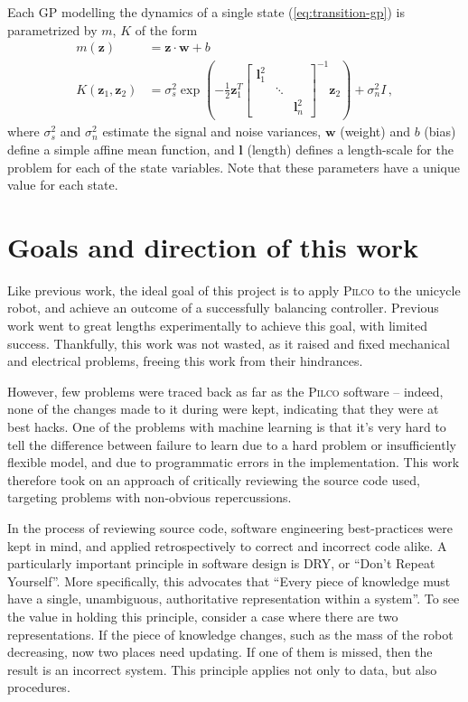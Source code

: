 \documentclass[main.tex]{subfiles}
\begin{document}
		Each GP modelling the dynamics of a single state (\cref{eq:transition-gp}) is parametrized by $m$, $K$ of the form
		\begin{align}
			m(\bm{z}) &= \bm{z} \cdot \bm{w} + b \\
			K(\bm{z}_1, \bm{z}_2) &= \sigma_s^2 \exp \left(
				-\frac{1}{2}
				\bm{z}_1^T
				\begin{bmatrix}
					\bm{l}_1^2 && \\
					& \ddots & \\
					&& \bm{l}_n^2
				\end{bmatrix}^{-1}
				\bm{z}_2
			\right) + \sigma_n^2 I \,,
		\end{align}
		where $\sigma_s^2$ and $\sigma_n^2$ estimate the signal and noise variances, $\bm{w}$ (weight) and $b$ (bias) define a simple affine mean function, and $\bm{l}$ (length) defines a length-scale for the problem for each of the state variables.
		Note that these parameters have a unique value for each state.

\section{Goals and direction of this work}
	\label{sec:dry}

	Like previous work, the ideal goal of this project is to apply \textsc{Pilco} to the unicycle robot, and achieve an outcome of a successfully balancing controller.
	Previous work went to great lengths experimentally to achieve this goal, with limited success. Thankfully, this work was not wasted, as it raised and fixed mechanical and electrical problems, freeing this work from their hindrances.

	However, few problems were traced back as far as the \textsc{Pilco} software -- indeed, none of the changes made to it during \cite{aleksi} were kept, indicating that they were at best hacks.
	One of the problems with machine learning is that it's very hard to tell the difference between failure to learn due to a hard problem or insufficiently flexible model, and due to programmatic errors in the implementation.
	This work therefore took on an approach of critically reviewing the source code used, targeting problems with non-obvious repercussions.

	In the process of reviewing source code, software engineering best-practices were kept in mind, and applied retrospectively to correct and incorrect code alike.
	A particularly important principle in software design is DRY, or \enquote{Don't Repeat Yourself}.
	More specifically, this advocates that \enquote{Every piece of knowledge must have a single, unambiguous, authoritative representation within a system}\cite{dry}.
	To see the value in holding this principle, consider a case where there are two representations. If the piece of knowledge changes, such as the mass of the robot decreasing, now two places need updating. If one of them is missed, then the result is an incorrect system. This principle applies not only to data, but also procedures.





\bib
\end{document}

